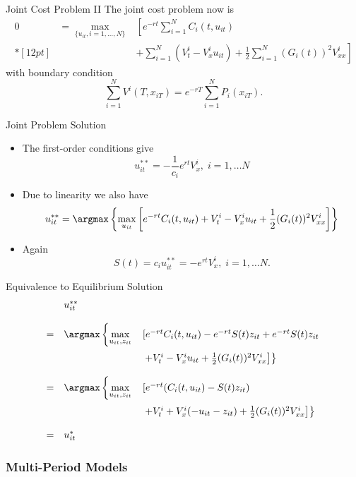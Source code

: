 
{Joint Cost Problem II}
The joint cost problem now is
$$
\begin{array}{lll}
0&=\displaystyle \max_{\{u_{it},i=1, \ldots, N\}}&\displaystyle \left[e^{-rt}\sum_{i=1}^N C_i(t,u_{it})\right.\\*[12pt]
&&+\displaystyle \left.\sum_{i=1}^N (V^i_t -V_x^iu_{it}) + \frac{1}{2}\sum_{i=1}^N(G_i(t))^2 V^i_{xx}\right]
\end{array}
$$
with boundary condition
$$
\sum_{i=1}^N V^i(T, x_{iT})=e^{-rT}\sum_{i=1}^N P_i(x_{iT}).
$$

{Joint Problem Solution}
\begin{itemize}
\item<1-> The first-order conditions give
$$
u_{it}^{**}= -\frac{1}{c_i} e^{rt} V^i_x, \; i=1, \ldots N
$$
\item<2-> Due to linearity we also have
$$
u_{it}^{**}= \argmax \left\{ \max_{u_{it}} \left[e^{-rt} C_i(t,u_{it}) + V^i_t -V_x^iu_{it} + \frac{1}{2}(G_i(t))^2 V^i_{xx}\right]
\right\}
$$
\item<3-> Again
$$
S(t) = c_i u_{it}^{**}= -e^{rt}V^i_x, \; i=1, \ldots N.
$$
\end{itemize}

{Equivalence to Equilibrium Solution}
$$
\begin{array}{lll}
&u_{it}^{**}&\\*[12pt]
=&  \argmax \left\{ \displaystyle \max_{u_{it},z_{it}} \right. &\left[e^{-rt} C_i(t,u_{it}) -e^{-rt}S(t)z_{it} +e^{-rt}S(t)z_{it} \right.\\*[12pt]
 &&\left.\left. + V^i_t -V_x^iu_{it} + \frac{1}{2}(G_i(t))^2 V^i_{xx}\right]
\right\}\\*[12pt]
=&  \argmax \left\{ \displaystyle \max_{u_{it},z_{it}} \right. &\left[e^{-rt} (C_i(t,u_{it}) -S(t)z_{it}) \right. \\*[12pt]
&&\left.\left. + V^i_t +V_x^i(-u_{it}-z_{it}) + \frac{1}{2}(G_i(t))^2 V^i_{xx}\right]
\right\}\\*[12pt]
=&u_{it}^*&
\end{array}
$$

\subsubsection{Multi-Period Models}


